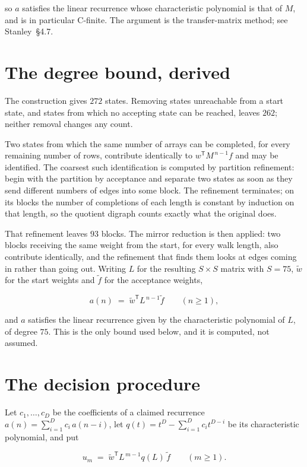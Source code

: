 \documentclass[11pt]{article}
\theoremstyle{definition}
\begin{document}
so $a$ satisfies the linear recurrence whose characteristic polynomial is that of $M$, and is in particular C-finite. The argument is the transfer-matrix method; see Stanley~\S4.7.

\section{The degree bound, derived}

The construction gives $272$ states. Removing states unreachable from a start state, and states from which no accepting state can be reached, leaves $262$; neither removal changes any count.

Two states from which the same number of arrays can be completed, for every remaining number of rows, contribute identically to $w^{\mathsf T}M^{\,n-1}f$ and may be identified. The coarsest such identification is computed by partition refinement: begin with the partition by acceptance and separate two states as soon as they send different numbers of edges into some block. The refinement terminates; on its blocks the number of completions of each length is constant by induction on that length, so the quotient digraph counts exactly what the original does.

That refinement leaves $93$ blocks. The mirror reduction is then applied: two blocks receiving the same weight from the start, for every walk length, also contribute identically, and the refinement that finds them looks at edges coming in rather than going out. Writing $L$ for the resulting $S \times S$ matrix with $S = 75$, $\tilde w$ for the start weights and $\tilde f$ for the acceptance weights,

\[a(n) \;=\; \tilde w^{\mathsf T} L^{\,n-1} \tilde f \qquad (n \ge 1),\]

and $a$ satisfies the linear recurrence given by the characteristic polynomial of $L$, of degree $75$. This is the only bound used below, and it is computed, not assumed.

\section{The decision procedure}

Let $c_1,\dots,c_D$ be the coefficients of a claimed recurrence $a(n) = \sum_{i=1}^{D} c_i\,a(n-i)$, let $q(t) = t^{D} - \sum_{i=1}^{D} c_i t^{D-i}$ be its characteristic polynomial, and put

\[u_m \;=\; \tilde w^{\mathsf T} L^{\,m-1} q(L)\,\tilde f \qquad (m \ge 1).\]
\end{document}

